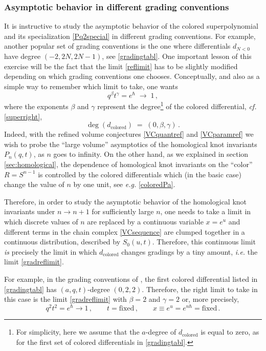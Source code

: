 \documentclass[hyper,letterpaper]{JHEP3}
\newcommand{\be}{\begin{equation}}
\newcommand{\ee}{\end{equation}}
\begin{document}
\subsubsection{Asymptotic behavior in different grading conventions}
\label{sec:saddle_DGR}

It is instructive to study the asymptotic behavior of the colored superpolynomial and its specialization \eqref{Pq2special}
in different grading conventions. For example, another popular set of grading conventions
is the one
where differentials $d_{N<0}$ have degree $(-2,2N,2N-1)$, see \eqref{gradingtabl}.
One important lesson of this exercise will be the fact that the limit \eqref{reflimit}
has to be slightly modified depending on which grading conventions one chooses.
Conceptually, and also as a simple way to remember which limit to take, one wants
\be
q^{\beta} t^{\gamma}  = e^{\hbar} \; \to \; 1 \,,
\label{gradreflimit}
\ee
where the exponents $\beta$ and $\gamma$ represent the degree\footnote{For simplicity,
here we assume that the $a$-degree of $d_{\text{colored}}$ is equal to zero,
as for the first set of colored differentials in \eqref{gradingtabl}.}
of the colored differential, {\it cf.} \eqref{superright},
\be
\deg (d_{\text{colored}}) \; = \; (0 , \beta, \gamma) \,.
\ee
Indeed, with the refined volume conjectures \eqref{VCquantref} and \eqref{VCparamref}
we wish to probe the ``large volume'' asymptotics of the homological knot invariants $P_n (q,t)$, as $n$ goes to infinity.
On the other hand, as we explained in section \ref{sec:homological}, the dependence of
homological knot invariants on the ``color'' $R = S^{n-1}$ is controlled by
the colored differentials which (in the basic case) change the value of $n$ by one unit, see {\it e.g.} \eqref{coloredPa}.

Therefore, in order to study the asymptotic behavior of the homological knot invariants under $n \to n+1$
for sufficiently large $n$, one needs to take a limit in which discrete values of $n$ are replaced
by a continuous variable $x = e^u$ and different terms in the chain complex \eqref{VCsequence}
are clumped together in a continuous distribution, described by $S_0 (u,t)$.
Therefore, this continuous limit {\it is} precisely the limit in which $d_{\text{colored}}$
changes gradings by a tiny amount, {\it i.e.} the limit \eqref{gradreflimit}.

For example, in the grading conventions of \cite{DGR},
the first colored differential listed in \eqref{gradingtabl} has $(a,q,t)$-degree $(0,2,2)$.
Therefore, the right limit to take in this case is the limit \eqref{gradreflimit} with $\beta = 2$
and $\gamma=2$ or, more precisely,
\be
q^2 t^2 = e^{\hbar} \to 1 \,, \qquad t = \text{fixed} \,, \qquad x \equiv e^u = e^{n \hbar} = \text{fixed} \,.
\label{gradlimit}
\ee
\end{document}
